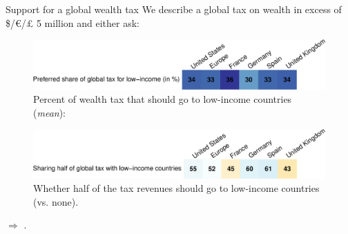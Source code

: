\documentclass[aspectratio=169,xcolor=dvipsnames, 11pt,mathserif]{beamer}
\begin{document}
\begin{framefont}{\small}
\begin{frame}{Support for a global wealth tax\label{wealth_tax}}
\bbvs \ip We describe a global tax on wealth in excess of \$/\euro{}/£ 5 million and either ask:\pause
\ee
\vspace{-.4cm}
\begin{figure}
    \centering 
    \caption{Percent of wealth tax that should go to low-income countries (\textit{mean}):}\vspace{-.2cm}%
    \includegraphics[height=.3\textheight]{../figures/country_comparison/global_tax_global_share_mean.pdf} 
\end{figure}\pause
    \begin{figure}
        \centering 
        \caption{Whether half of the tax revenues should go to low-income countries (vs. none).}\vspace{-.2cm}
        \includegraphics[height=.3\textheight]{../figures/country_comparison/global_tax_sharing_positive.pdf} 
    \end{figure}
$\Rightarrow$ .
\end{frame}


\end{framefont}
\end{document}
